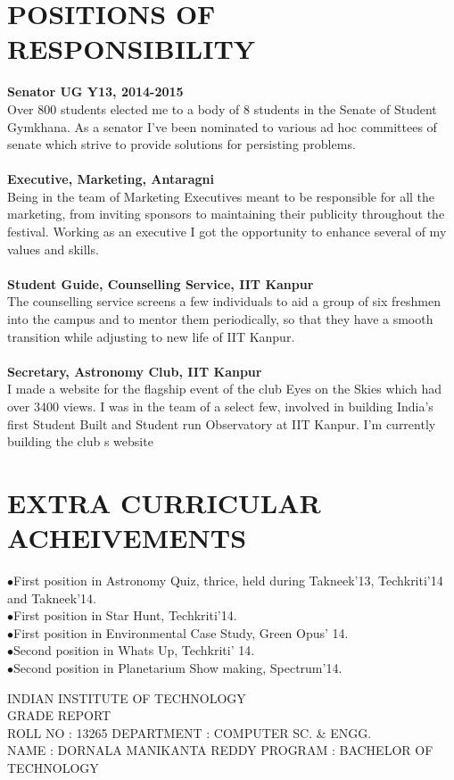 \documentclass{article}
\newcommand{\sepspace}{\vspace*{0.8em}}
\newcommand{\NewPart}[1]{\section*{\uppercase{#1}}}
\newcommand{\PORentry}[2]{\textbf{#1} \\ #2	\\
		}
\begin{document}
\sepspace
\NewPart{Positions of Responsibility}
\PORentry{Senator UG Y13, 2014-2015}{Over 800 students elected me to a body of 8 students in the Senate of Student Gymkhana. As a senator I’ve been nominated to various ad hoc committees of senate which strive to provide solutions for persisting problems.}
\\
\PORentry{Executive, Marketing, Antaragni}{Being in the team of Marketing Executives meant to be responsible for all the marketing, from inviting
sponsors to maintaining their publicity throughout the festival. Working as an executive I got the opportunity
to enhance several of my values and skills.}
\\
\PORentry{Student Guide, Counselling Service, IIT Kanpur}{The counselling service screens a few individuals to aid a group of six freshmen into the campus and to mentor them periodically, so that they have a smooth transition while adjusting to new life of IIT Kanpur.}
\\
\PORentry{Secretary, Astronomy Club, IIT Kanpur}{I made a website for the flagship event of the club Eyes on the Skies which had over 3400 views.
I was in the team of a select few, involved in building India’s first Student Built and Student run Observatory
at IIT Kanpur. I’m currently building the club s website}
\NewPart{Extra Curricular Acheivements}
$\bullet$First position in Astronomy Quiz, thrice, held during Takneek’13, Techkriti’14 and Takneek’14.\\
$\bullet$First position in Star Hunt, Techkriti’14.\\
$\bullet$First position in Environmental Case Study, Green Opus’ 14.\\
$\bullet$Second position in Whats Up, Techkriti’ 14.\\
$\bullet$Second position in Planetarium Show making, Spectrum’14.\\
\pagebreak
\begin{center}
	\scriptsize{INDIAN INSTITUTE OF TECHNOLOGY}\\
	\scriptsize{GRADE REPORT}\\
	\scriptsize{ROLL NO : 13265} \hfill \scriptsize{DEPARTMENT : COMPUTER SC. \& ENGG.}\\
	\scriptsize{NAME : DORNALA MANIKANTA REDDY} \hfill \scriptsize{PROGRAM : BACHELOR OF TECHNOLOGY}\\
\end{center}
\end{document}
